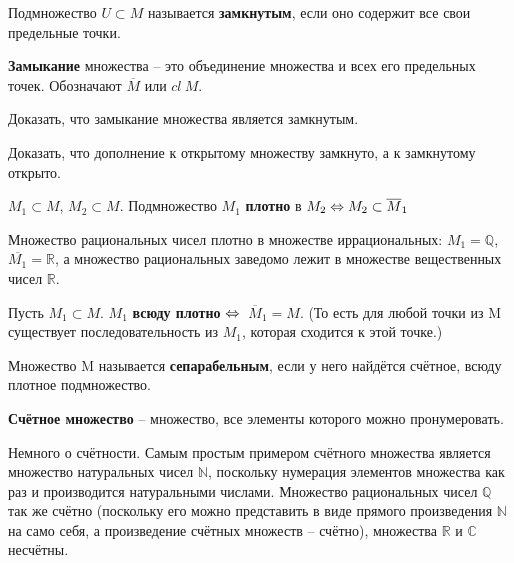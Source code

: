 \documentclass[12pt]{article}
\begin{document}
		\begin{defi}
			Подмножество $U \subset M$ называется \textbf{замкнутым}, если оно содержит все свои предельные
			точки.
		\end{defi}

		\begin{defi}
			\textbf{Замыкание} множества -- это объединение множества и всех его предельных точек. Обозначают $\overline{M}$ или $cl ~ M$.
		\end{defi}
	
		\exc Доказать, что замыкание множества является замкнутым.
	
		\exc Доказать, что дополнение к открытому множеству замкнуто, а к замкнутому открыто.
	
		\begin{defi}
			$M_1 \subset M$, $M_2 \subset M$. Подмножество $M_1$ \textbf{плотно} в $M_2 \Leftrightarrow M_2 \subset \overline{M}_1$
		\end{defi}


		\example Множество рациональных чисел плотно в множестве иррациональных: $M_1 = \mathbb{Q}$,
		$\overline{M_1} = \mathbb{R}$, а множество рациональных заведомо лежит в множестве вещественных чисел
		$\mathbb{R}$.
	
		\begin{defi}
			Пусть $M_1 \subset M$. $M_1$ \textbf{всюду плотно} $\Leftrightarrow$ $\
			\overline{M}_1 = M$. (То есть для любой точки из M существует 
			последовательность из $M_1$, которая сходится к этой точке.)
		\end{defi}
	
		\begin{defi}
			Множество M называется \textbf{сепарабельным}, если у него найдётся счётное, всюду плотное подмножество.
		\end{defi}
	
		\begin{defi}
			\textbf{Счётное множество} -- множество, все элементы которого можно пронумеровать.
		\end{defi}

		{\color{gray} Немного о счётности. Самым простым примером счётного множества является множество натуральных чисел $\mathbb{N}$, поскольку нумерация элементов множества как раз и производится натуральными числами. Множество рациональных чисел $\mathbb{Q}$ так же счётно (поскольку его можно представить в виде прямого произведения $\mathbb{N}$ на само себя, а произведение счётных множеств -- счётно), множества $\mathbb{R}$ и $\mathbb{C}$ несчётны.}
\end{document}
